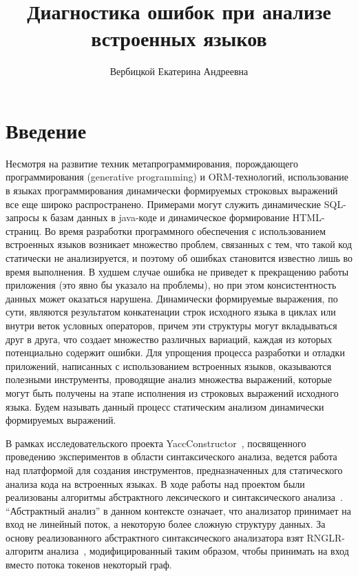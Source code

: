 
\title{Диагностика ошибок при анализе встроенных языков}
%

\author{Вербицкой Екатерина Андреевна}
%
%
%

\maketitle              %

\section*{Введение}
Несмотря на развитие техник метапрограммирования, порождающего программирования 
(generative programming) и ORM-технологий, использование в языках программирования 
динамически формируемых строковых выражений все еще широко распространено. 
Примерами могут служить динамические SQL-запросы к базам данных в java-коде и 
динамическое формирование HTML-страниц. Во время разработки программного обеспечения
с использованием встроенных языков возникает множество проблем, связанных с тем, 
что такой код статически не анализируется, и поэтому об ошибках становится 
известно лишь во время выполнения. В худшем случае ошибка не приведет к прекращению 
работы приложения (это явно бы указало на проблемы), но при этом консистентность 
данных может оказаться нарушена. Динамически формируемые выражения, по сути, являются 
результатом конкатенации строк исходного языка в циклах или внутри веток условных 
операторов, причем эти структуры могут вкладываться друг в друга, что создает 
множество различных вариаций, каждая из которых потенциально содержит ошибки. 
Для упрощения процесса разработки и отладки приложений, написанных с использованием 
встроенных языков, оказываются полезными инструменты, проводящие анализ множества 
выражений, которые могут быть получены на этапе исполнения из строковых выражений 
исходного языка. Будем называть данный процесс статическим анализом динамически 
формируемых выражений.

В рамках исследовательского проекта YaccConstructor~\cite{YaccConstructor}, посвященного проведению 
экспериментов в области синтаксического анализа, ведется работа над платформой 
для создания инструментов, предназначенных для статического анализа кода на встроенных
языках. В ходе работы над проектом были реализованы алгоритмы абстрактного 
лексического и синтаксического анализа~\cite{grigorev2013glr}. “Абстрактный анализ” в данном контексте 
означает, что анализатор принимает на вход не линейный поток, а некоторую более 
сложную структуру данных. За основу реализованного абстрактного синтаксического 
анализатора взят RNGLR-алгоритм анализа~\cite{Scott:2006:RNG:1146809.1146810}, модифицированный таким образом, чтобы 
принимать на вход вместо потока токенов некоторый граф.

